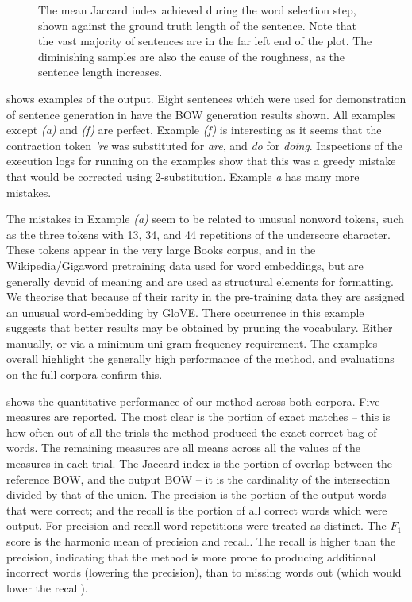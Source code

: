 {\begin{figure}
	\caption{\label{figure:exactlenscore} The mean Jaccard index achieved during the word selection step, shown against the ground truth length of the sentence. Note that the vast majority of sentences are in the far left end of the plot. The diminishing samples are also the cause of the roughness, as the sentence length increases.}
\end{figure}




 shows examples of the output. Eight sentences which were used for demonstration of sentence generation in \textcite{iyyer2014generating,Bowman2015SmoothGeneration} have the BOW generation results shown. All examples except \emph{(a)} and \emph{(f)} are perfect. Example \emph{(f)} is interesting as it seems that the contraction token \emph{'re} was substituted for \emph{are}, and \emph{do} for \emph{doing}. Inspections of the execution logs for running on the examples show that this was a greedy mistake that would be corrected using 2-substitution.  Example \emph{a} has many more mistakes.

The mistakes in Example \emph{(a)} seem to be related to unusual nonword tokens, such as the three tokens with 13, 34, and 44 repetitions of the underscore character. These tokens appear in the very large Books corpus, and in the Wikipedia/Gigaword pretraining data used for word embeddings, but are generally devoid of meaning and are used as structural elements for formatting. We theorise that because of their rarity in the pre-training data they are assigned an unusual word-embedding by GloVE. There occurrence in this example suggests that better results may be obtained by pruning the vocabulary. Either manually, or via a minimum uni-gram frequency requirement. The examples overall highlight the generally high performance of the method, and evaluations on the full corpora confirm this.

 shows the quantitative performance of our method across both corpora. Five measures are reported. The most clear is the portion of exact matches -- this is how often out of all the trials the method produced the exact correct bag of words. The remaining measures are all means across all the values of the measures in each trial.  The Jaccard index is the portion of overlap between the reference BOW, and the output BOW -- it is the cardinality of the intersection divided by that of the union. The precision is the portion of the output words that were correct; and the recall is the portion of all correct words which were output. For precision and recall word repetitions were treated as distinct. The $F_1$ score is the harmonic mean of precision and recall. The recall is higher than the precision, indicating that the method is more prone to producing additional incorrect words (lowering the precision), than to missing words out (which would lower the recall). 

}
